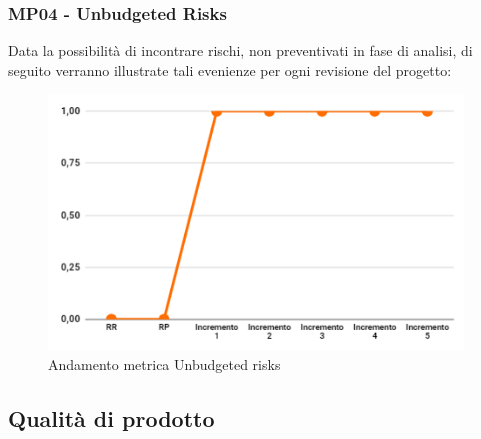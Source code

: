 \subsubsection{MP04 - Unbudgeted Risks}
Data la possibilità di incontrare rischi, non preventivati in fase di analisi, di seguito verranno illustrate tali evenienze per ogni revisione del progetto:
\begin{figure}[H]
	\centering
	\includegraphics[width=11cm]{images/unbudgeted_risks.png}
	\caption{Andamento metrica Unbudgeted risks}
\end{figure}

\subsection{Qualità di prodotto}

